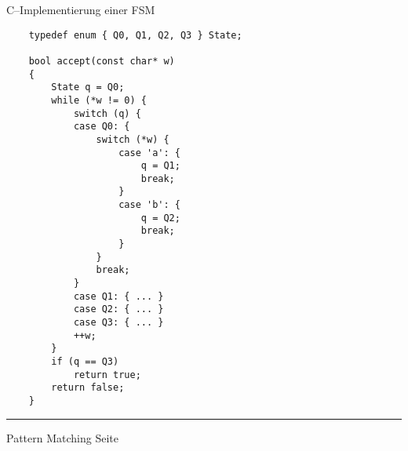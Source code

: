 \begin{slide}{}
\normalsize

\begin{center}
C--Implementierung einer FSM
\end{center}
\vspace*{0.5cm}

\footnotesize
\begin{verbatim}
    typedef enum { Q0, Q1, Q2, Q3 } State;
    
    bool accept(const char* w) 
    {
        State q = Q0;
        while (*w != 0) {
            switch (q) {
            case Q0: {
                switch (*w) {
                    case 'a': {
                        q = Q1;
                        break;
                    }
                    case 'b': {
                        q = Q2;
                        break;
                    }
                }
                break;
            }
            case Q1: { ... }
            case Q2: { ... }
            case Q3: { ... }
            ++w;
        }
        if (q == Q3)
            return true;
        return false;
    }
\end{verbatim}


\vspace*{\fill}
\tiny \addtocounter{mypage}{1}
\rule{17cm}{1mm}
Pattern Matching \hspace*{\fill} Seite 
\end{slide}


